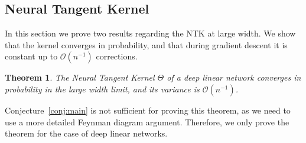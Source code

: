 \documentclass[english]{article}
\newtheorem{thm}{Theorem}
\newcommand{\cO}{\ensuremath{\mathcal{O}}}
\begin{document}
\subsection{Neural Tangent Kernel}
\label{app:ntk}

In this section we prove two results regarding the NTK at large width.
We show that the kernel converges in probability, and that during gradient descent it is constant up to $\cO(n^{-1})$ corrections.

\begin{thm}
  The Neural Tangent Kernel $\Theta$ of a deep linear network converges in probability in the large width limit, and its variance is $\cO(n^{-1})$.
\end{thm}
Conjecture~\ref{conj:main} is not sufficient for proving this theorem, as we need to use a more detailed Feynman diagram argument.
Therefore, we only prove the theorem for the case of deep linear networks.
\end{document}
